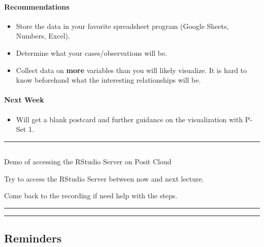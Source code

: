\documentclass[
  letterpaper,
  DIV=11,
  numbers=noendperiod]{scrartcl}
\let\oldparagraph\paragraph
\renewcommand{\paragraph}[1]{\oldparagraph{#1}\mbox{}}
\providecommand{\tightlist}{%
  \setlength{\itemsep}{0pt}\setlength{\parskip}{0pt}}\usepackage{longtable,booktabs,array}
\begin{document}
\hypertarget{recommendations}{%
\paragraph{Recommendations}\label{recommendations}}

\begin{itemize}
\item
  Store the data in your favorite spreadsheet program (Google Sheets,
  Numbers, Excel).
\item
  Determine what your cases/observations will be.
\item
  Collect data on \textbf{more} variables than you will likely
  visualize. It is hard to know beforehand what the interesting
  relationships will be.
\end{itemize}

\hypertarget{next-week}{%
\paragraph{Next Week}\label{next-week}}

\begin{itemize}
\tightlist
\item
  Will get a blank postcard and further guidance on the visualization
  with P-Set 1.
\end{itemize}

\begin{center}\rule{0.5\linewidth}{0.5pt}\end{center}

\hypertarget{section}{%
\subsection{}\label{section}}

Demo of accessing the RStudio Server on Posit Cloud

Try to access the RStudio Server between now and next lecture.

Come back to the recording if need help with the steps.

\begin{center}\rule{0.5\linewidth}{0.5pt}\end{center}

\begin{center}\rule{0.5\linewidth}{0.5pt}\end{center}

\hypertarget{reminders}{%
\subsection{Reminders}\label{reminders}}
\end{document}
